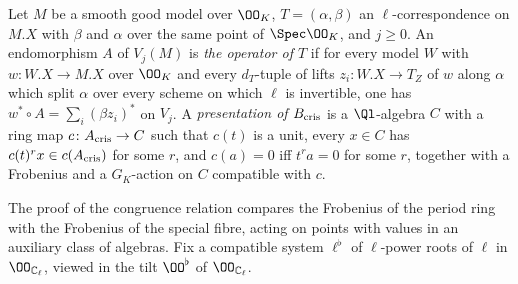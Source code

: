 \begin{definition}\label{pf:steps1:def:ishk}
Let $M$ be a smooth good model over $\OO_K$, $T=(\alpha,\beta)$ an $\ell$-correspondence on $M.X$ with $\beta$ and
$\alpha$ over the same point of $\Spec\OO_K$, and $j\ge0$. An endomorphism $A$ of $V_j(M)$ is \emph{the operator of
$T$} if for every model $W$ with $w\colon W.X\to M.X$ over $\OO_K$ and every $d_T$-tuple of lifts $z_i\colon W.X\to
T_Z$ of $w$ along $\alpha$ which split $\alpha$ over every scheme on which $\ell$ is invertible, one has
$w^*\circ A=\sum_i(\beta z_i)^*$ on $V_j$. A \emph{presentation of $B_{\mathrm{cris}}$} is a $\Ql$-algebra $C$ with a ring map
$c\colon A_{\mathrm{cris}}\to C$ such that $c(t)$ is a unit, every $x\in C$ has $c(t)^rx\in c(A_{\mathrm{cris}})$ for some $r$, and
$c(a)=0$ iff $t^ra=0$ for some $r$, together with a Frobenius and a $G_K$-action on $C$ compatible with $c$.
 
\end{definition}

The proof of the congruence relation compares the Frobenius of the period ring with the Frobenius of the special fibre, acting
on points with values in an auxiliary class of algebras. Fix a compatible system $\ell^\flat$ of $\ell$-power roots of $\ell$ in
$\OO_{\stepsICl}$, viewed in the tilt $\OO^\flat$ of $\OO_{\stepsICl}$.

